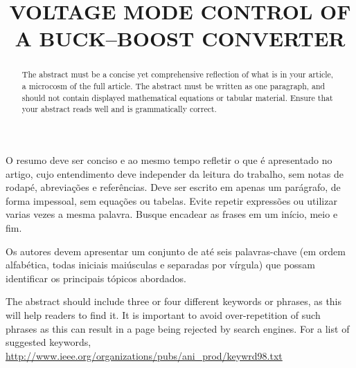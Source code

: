 \title{VOLTAGE MODE CONTROL OF A BUCK--BOOST CONVERTER} %

\maketitle




\begin{resumo}  O resumo deve ser conciso e ao mesmo tempo refletir o que é apresentado no artigo, cujo entendimento deve independer da leitura do trabalho, sem notas de rodapé, abreviações e referências. Deve ser escrito em apenas um parágrafo, de forma impessoal, sem equações ou tabelas. Evite repetir expressões ou utilizar varias vezes a mesma palavra. Busque encadear as frases em um início, meio e fim.
\end{resumo}

\begin{palavraschave }
		Os autores devem apresentar um conjunto de até seis palavras-chave (em ordem alfabética, todas iniciais maiúsculas e separadas por vírgula) que possam identificar os principais tópicos abordados.	
\end{palavraschave }

\englishtitle

\begin{abstract}
	The abstract must be a concise yet comprehensive reflection of what is in your article, a microcosm of the full article. The abstract must be written as one paragraph, and should not contain displayed mathematical equations or tabular material.  Ensure that your abstract reads well and is grammatically correct.
\end{abstract}

\begin{keywords}
	The abstract should include three or four different keywords or phrases, as this will help readers to find it. It is important to avoid over-repetition of such phrases as this can result in a page being rejected by search engines. For a list of suggested keywords, \url{http://www.ieee.org/organizations/pubs/ani_prod/keywrd98.txt}
\end{keywords}

